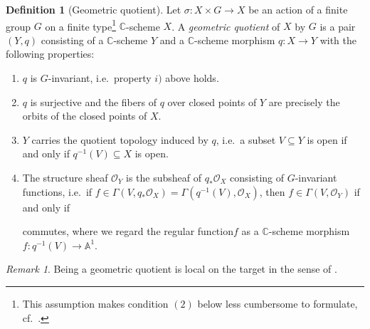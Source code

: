\documentclass[12pt,a4paper]{amsart}
\theoremstyle{plain}
\theoremstyle{definition}
\newtheorem{defn}[thm]{Definition}
\theoremstyle{remark}
\newtheorem{rem}[thm]{Remark}
\begin{document}
\begin{defn}[Geometric quotient]
  Let $\sigma \colon X \times G \to X$ be an action of a finite group $G$ on a finite type\footnote{This assumption makes condition $(2)$ below less cumbersome to formulate, cf.~\cite[Definition 0.6]{mfk94}.} $\mathbb{C}$-scheme $X$.
  A \textit{geometric quotient} of $X$ by $G$ is a pair $(Y, q)$ consisting of a $\mathbb{C}$-scheme $Y$ and a $\mathbb{C}$-scheme morphism $q \colon X \to Y$ with the following properties:
  \begin{enumerate}
    \item $q$ is $G$-invariant, i.e.~property $i)$ above holds.
    \item $q$ is surjective and the fibers of $q$ over closed points of $Y$ are precisely the orbits of the closed points of $X$.
    \item $Y$ carries the quotient topology induced by $q$, i.e.~a subset $V \subseteq Y$ is open if and only if $q^{-1}(V) \subseteq X$ is open.
    \item The structure sheaf $\mathscr{O}_{Y}$ is the subsheaf of $q_{*}\mathscr{O}_{X}$ consisting of $G$-invariant functions, i.e.~if $f \in \Gamma(V, q_{*}\mathscr{O}_{X}) = \Gamma(q^{-1}(V),\mathscr{O}_{X})$, then $f \in \Gamma(V, \mathscr{O}_{Y})$ if and only if

      \begin{center}
      \end{center}
      commutes, where we regard the regular function$f$ as a $\mathbb{C}$-scheme morphism $f \colon q^{-1}(V) \to \mathbb{A}^{1}$.
    \end{enumerate}
\end{defn}

\begin{rem}\label{rem:loct}
  Being a geometric quotient is local on the target in the sense of \cite[Appendix C]{gw10}.
\end{rem}
\end{document}
